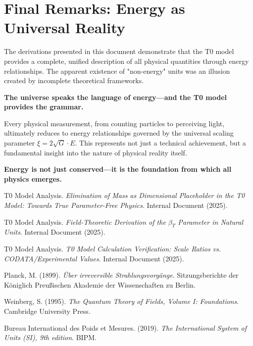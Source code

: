 \documentclass[12pt,a4paper]{article}
\newcommand{\xipar}{\xi}
\begin{document}
\section{Final Remarks: Energy as Universal Reality}
\label{sec:final_remarks}

The derivations presented in this document demonstrate that the T0 model provides a complete, unified description of all physical quantities through energy relationships. The apparent existence of "non-energy" units was an illusion created by incomplete theoretical frameworks.

\textbf{The universe speaks the language of energy—and the T0 model provides the grammar.}

Every physical measurement, from counting particles to perceiving light, ultimately reduces to energy relationships governed by the universal scaling parameter $\xipar = 2\sqrt{G} \cdot E$. This represents not just a technical achievement, but a fundamental insight into the nature of physical reality itself.

\textbf{Energy is not just conserved—it is the foundation from which all physics emerges.}

\begin{thebibliography}{9}
	T0 Model Analysis. \textit{Elimination of Mass as Dimensional Placeholder in the T0 Model: Towards True Parameter-Free Physics}. Internal Document (2025).
	
	T0 Model Analysis. \textit{Field-Theoretic Derivation of the $\beta_T$ Parameter in Natural Units}. Internal Document (2025).
	
	T0 Model Analysis. \textit{T0 Model Calculation Verification: Scale Ratios vs. CODATA/Experimental Values}. Internal Document (2025).
	
	Planck, M. (1899). \textit{Über irreversible Strahlungsvorgänge}. Sitzungsberichte der Königlich Preußischen Akademie der Wissenschaften zu Berlin.
	
	Weinberg, S. (1995). \textit{The Quantum Theory of Fields, Volume I: Foundations}. Cambridge University Press.
	
	Bureau International des Poids et Mesures. (2019). \textit{The International System of Units (SI), 9th edition}. BIPM.
\end{thebibliography}
\end{document}
